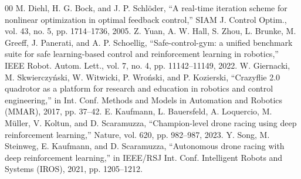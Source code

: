 \documentclass[conference]{IEEEtran}
\begin{document}
\begin{thebibliography}{00}
 M. Diehl, H. G. Bock, and J. P. Schl\"oder, ``A real-time iteration scheme for nonlinear optimization in optimal feedback control,'' SIAM J. Control Optim., vol. 43, no. 5, pp. 1714--1736, 2005.
 Z. Yuan, A. W. Hall, S. Zhou, L. Brunke, M. Greeff, J. Panerati, and A. P. Schoellig, ``Safe-control-gym: a unified benchmark suite for safe learning-based control and reinforcement learning in robotics,'' IEEE Robot. Autom. Lett., vol. 7, no. 4, pp. 11142--11149, 2022.
 W. Giernacki, M. Skwierczy\'nski, W. Witwicki, P. Wro\'nski, and P. Kozierski, ``Crazyflie 2.0 quadrotor as a platform for research and education in robotics and control engineering,'' in Int. Conf. Methods and Models in Automation and Robotics (MMAR), 2017, pp. 37--42.
 E. Kaufmann, L. Bauersfeld, A. Loquercio, M. M\"uller, V. Koltun, and D. Scaramuzza, ``Champion-level drone racing using deep reinforcement learning,'' Nature, vol. 620, pp. 982--987, 2023.
 Y. Song, M. Steinweg, E. Kaufmann, and D. Scaramuzza, ``Autonomous drone racing with deep reinforcement learning,'' in IEEE/RSJ Int. Conf. Intelligent Robots and Systems (IROS), 2021, pp. 1205--1212.
\end{thebibliography}
\end{document}
